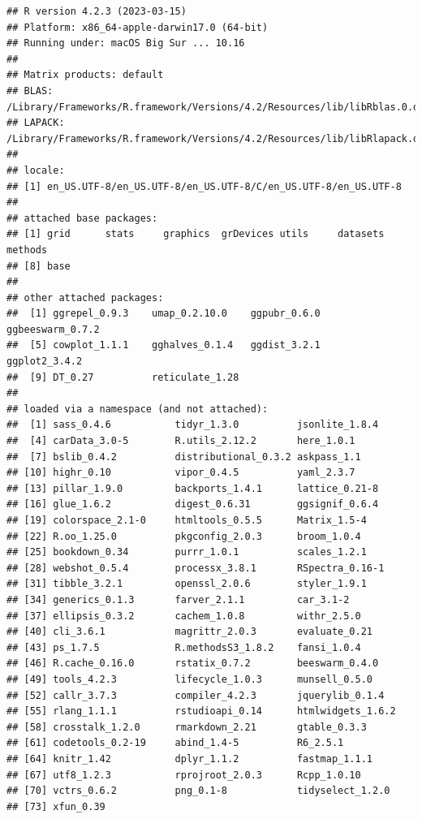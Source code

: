 \documentclass[
  11pt,
  oneside]{book}
\begin{document}
\begin{verbatim}
## R version 4.2.3 (2023-03-15)
## Platform: x86_64-apple-darwin17.0 (64-bit)
## Running under: macOS Big Sur ... 10.16
## 
## Matrix products: default
## BLAS:   /Library/Frameworks/R.framework/Versions/4.2/Resources/lib/libRblas.0.dylib
## LAPACK: /Library/Frameworks/R.framework/Versions/4.2/Resources/lib/libRlapack.dylib
## 
## locale:
## [1] en_US.UTF-8/en_US.UTF-8/en_US.UTF-8/C/en_US.UTF-8/en_US.UTF-8
## 
## attached base packages:
## [1] grid      stats     graphics  grDevices utils     datasets  methods  
## [8] base     
## 
## other attached packages:
##  [1] ggrepel_0.9.3    umap_0.2.10.0    ggpubr_0.6.0     ggbeeswarm_0.7.2
##  [5] cowplot_1.1.1    gghalves_0.1.4   ggdist_3.2.1     ggplot2_3.4.2   
##  [9] DT_0.27          reticulate_1.28 
## 
## loaded via a namespace (and not attached):
##  [1] sass_0.4.6           tidyr_1.3.0          jsonlite_1.8.4      
##  [4] carData_3.0-5        R.utils_2.12.2       here_1.0.1          
##  [7] bslib_0.4.2          distributional_0.3.2 askpass_1.1         
## [10] highr_0.10           vipor_0.4.5          yaml_2.3.7          
## [13] pillar_1.9.0         backports_1.4.1      lattice_0.21-8      
## [16] glue_1.6.2           digest_0.6.31        ggsignif_0.6.4      
## [19] colorspace_2.1-0     htmltools_0.5.5      Matrix_1.5-4        
## [22] R.oo_1.25.0          pkgconfig_2.0.3      broom_1.0.4         
## [25] bookdown_0.34        purrr_1.0.1          scales_1.2.1        
## [28] webshot_0.5.4        processx_3.8.1       RSpectra_0.16-1     
## [31] tibble_3.2.1         openssl_2.0.6        styler_1.9.1        
## [34] generics_0.1.3       farver_2.1.1         car_3.1-2           
## [37] ellipsis_0.3.2       cachem_1.0.8         withr_2.5.0         
## [40] cli_3.6.1            magrittr_2.0.3       evaluate_0.21       
## [43] ps_1.7.5             R.methodsS3_1.8.2    fansi_1.0.4         
## [46] R.cache_0.16.0       rstatix_0.7.2        beeswarm_0.4.0      
## [49] tools_4.2.3          lifecycle_1.0.3      munsell_0.5.0       
## [52] callr_3.7.3          compiler_4.2.3       jquerylib_0.1.4     
## [55] rlang_1.1.1          rstudioapi_0.14      htmlwidgets_1.6.2   
## [58] crosstalk_1.2.0      rmarkdown_2.21       gtable_0.3.3        
## [61] codetools_0.2-19     abind_1.4-5          R6_2.5.1            
## [64] knitr_1.42           dplyr_1.1.2          fastmap_1.1.1       
## [67] utf8_1.2.3           rprojroot_2.0.3      Rcpp_1.0.10         
## [70] vctrs_0.6.2          png_0.1-8            tidyselect_1.2.0    
## [73] xfun_0.39
\end{verbatim}
\end{document}
